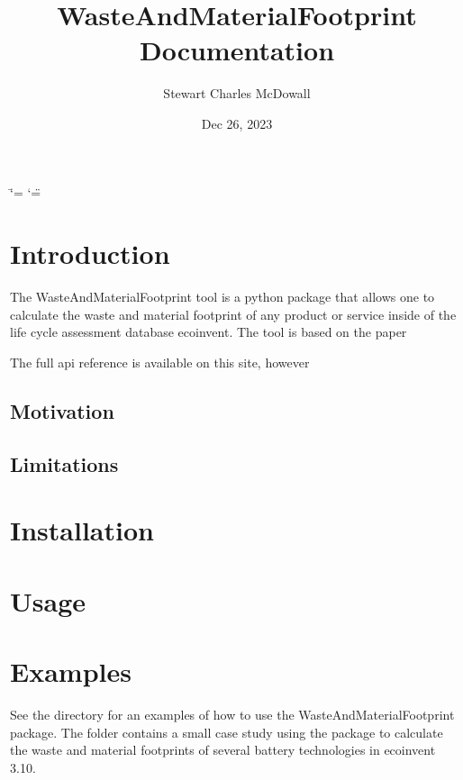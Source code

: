 \documentclass[letterpaper,10pt,english]{sphinxmanual}
\title{WasteAndMaterialFootprint Documentation}
\date{Dec 26, 2023}
\author{Stewart Charles McDowall}
\begin{document}
\ifdefined\shorthandoff
  \ifnum\catcode`\=\string=\active\shorthandoff{=}\fi
  \ifnum\catcode`\"=\active{}\fi
\fi

\pagestyle{empty}
\sphinxmaketitle
\pagestyle{plain}
\sphinxtableofcontents
\pagestyle{normal}
\label{\detokenize{index::doc}}


\sphinxstepscope


\chapter{Introduction}
\label{\detokenize{intro:introduction}}\label{\detokenize{intro::doc}}
\sphinxAtStartPar
The WasteAndMaterialFootprint tool is a python package that allows one to calculate the waste and material footprint of any product or service inside of the life cycle assessment database ecoinvent. The tool is based on the paper

\sphinxAtStartPar
{}

\sphinxAtStartPar
The full api reference is available on this site, however


\section{Motivation}
\label{\detokenize{intro:motivation}}

\section{Limitations}
\label{\detokenize{intro:limitations}}
\sphinxstepscope


\chapter{Installation}
\label{\detokenize{installation:installation}}\label{\detokenize{installation::doc}}
\sphinxstepscope


\chapter{Usage}
\label{\detokenize{usage:usage}}\label{\detokenize{usage::doc}}
\sphinxstepscope


\chapter{Examples}
\label{\detokenize{examples:examples}}\label{\detokenize{examples::doc}}
\sphinxAtStartPar
See the  directory for an examples of how to use the WasteAndMaterialFootprint package.
The folder  contains a small case study using the package to calculate the waste and material footprints of several battery technologies in ecoinvent 3.10.
\end{document}
